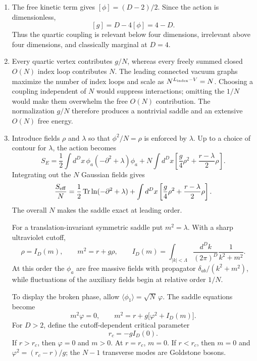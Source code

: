 \begin{enumerate}
  \begin{enumerate}
    \item[(a)]
    The free kinetic term gives
    \([\phi]=(D-2)/2\).  Since the action is dimensionless,
    \[
      \boxed{[g]=D-4[\phi]=4-D.}
    \]
    Thus the quartic coupling is relevant below four dimensions,
    irrelevant above four dimensions, and classically marginal at \(D=4\).
    \item[(b)]
    Every quartic vertex contributes \(g/N\), whereas every freely summed
    closed \(O(N)\) index loop contributes \(N\).  The leading connected
    vacuum graphs maximize the number of index loops and scale as
    \(N^{L_{\rm index}-V}=N\).  Choosing a coupling independent of \(N\)
    would suppress interactions; omitting the \(1/N\) would make them
    overwhelm the free \(O(N)\) contribution.  The normalization \(g/N\)
    therefore produces a nontrivial saddle and an extensive
    \(O(N)\) free energy.
    \item[(c)]
    Introduce fields \(\rho\) and \(\lambda\) so that
    \(\phi^2/N=\rho\) is enforced by \(\lambda\).  Up to a choice of
    contour for \(\lambda\), the action becomes
    \[
      S_E=\frac12\int d^Dx\,\phi_a(-\partial^2+\lambda)\phi_a
      +N\int d^Dx\left[
        \frac g4\rho^2+\frac{r-\lambda}{2}\rho\right].
    \]
    Integrating out the \(N\) Gaussian fields gives
    \[
      \frac{S_{\rm eff}}N=
      \frac12\operatorname{Tr}\ln(-\partial^2+\lambda)
      +\int d^Dx\left[
        \frac g4\rho^2+\frac{r-\lambda}{2}\rho\right].
    \]
    The overall \(N\) makes the saddle exact at leading order.

    For a translation-invariant symmetric saddle put
    \(m^2=\lambda\).  With a sharp ultraviolet cutoff,
    \[
      \rho=I_D(m),\qquad m^2=r+g\rho,\qquad
      I_D(m)=\int_{|k|<\Lambda}\frac{d^Dk}{(2\pi)^D}
        \frac1{k^2+m^2}.
    \]
    At this order the \(\phi_a\) are free massive fields with propagator
    \(\delta_{ab}/(k^2+m^2)\), while fluctuations of the auxiliary fields
    begin at relative order \(1/N\).

    To display the broken phase, allow
    \(\langle\phi_1\rangle=\sqrt N\,\varphi\).  The saddle equations become
    \[
      m^2\varphi=0,\qquad
      m^2=r+g\bigl[\varphi^2+I_D(m)\bigr].
    \]
    For \(D>2\), define the cutoff-dependent critical parameter
    \[
      r_c=-gI_D(0).
    \]
    If \(r>r_c\), then \(\varphi=0\) and \(m>0\).  At \(r=r_c\), \(m=0\).
    If \(r<r_c\), then \(m=0\) and
    \(\varphi^2=(r_c-r)/g\); the \(N-1\) transverse modes are Goldstone
    bosons.


\end{enumerate}
\end{enumerate}
